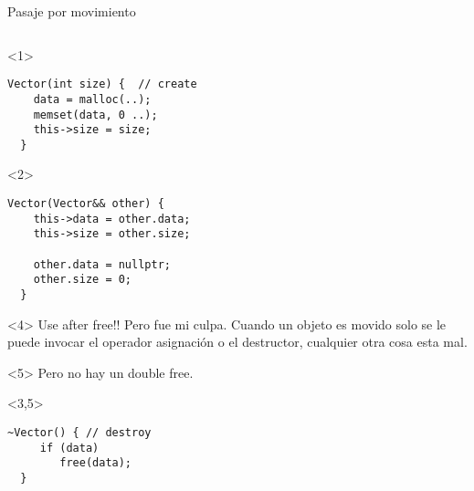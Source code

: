 \begin{frame}[fragile]{Pasaje por movimiento}
\begin{columns}[T]
\begin{column}{.5\linewidth}
        \begin{onlyenv}<1>
        \begin{lstlisting}[style=normal,firstnumber=5]
  Vector(int size) {  // create
    data = malloc(..);
    memset(data, 0 ..);
    this->size = size;
  }
        \end{lstlisting}
        \end{onlyenv}
        \begin{onlyenv}<2>
        \begin{lstlisting}[style=normal,firstnumber=5]
  Vector(Vector&& other) {
    this->data = other.data;
    this->size = other.size;

    other.data = nullptr;
    other.size = 0;
  }
        \end{lstlisting}
        \end{onlyenv}
        \begin{onlyenv}<4>
Use after free!! Pero fue mi culpa. Cuando un objeto es movido solo se le puede invocar el operador asignaci\'on o el destructor, cualquier otra cosa esta mal.
        \end{onlyenv}
        \begin{onlyenv}<5>
Pero no hay un double free.
        \end{onlyenv}
        \begin{visibleenv}<3,5>
        \begin{lstlisting}[style=normal,firstnumber=10]
  ~Vector() { // destroy
     if (data)
        free(data);
  }
        \end{lstlisting}
        \end{visibleenv}
      \end{column}
   \end{columns}
\end{frame}

